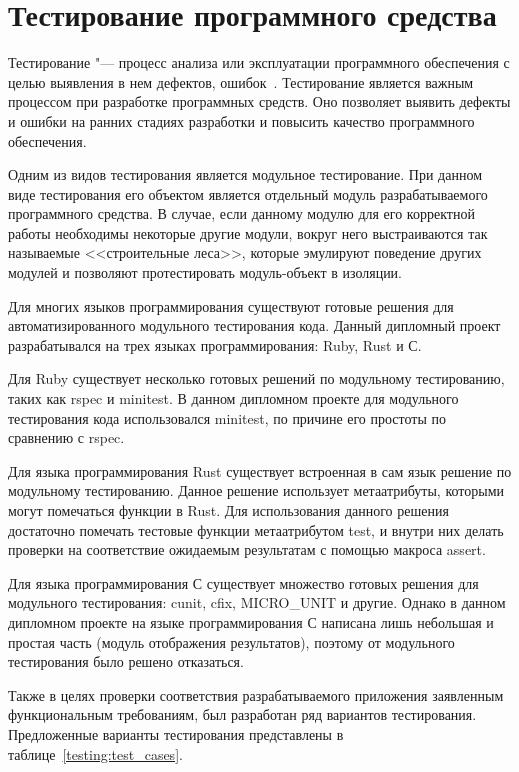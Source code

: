 \section{Тестирование программного средства}
\label{testing}

Тестирование "--- процесс анализа или эксплуатации программного обеспечения с целью выявления в нем дефектов, ошибок~\cite{testing_bahtizin}.
Тестирование является важным процессом при разработке программных средств.
Оно позволяет выявить дефекты и ошибки на ранних стадиях разработки и повысить качество программного обеспечения.

Одним из видов тестирования является модульное тестирование.
При данном виде тестирования его объектом является отдельный модуль разрабатываемого программного средства.
В случае, если данному модулю для его корректной работы необходимы некоторые другие модули, вокруг него выстраиваются так называемые
<<строительные леса>>, которые эмулируют поведение других модулей и позволяют протестировать модуль-объект в изоляции.

Для многих языков программирования существуют готовые решения для автоматизированного модульного тестирования кода.
Данный дипломный проект разрабатывался на трех языках программирования: Ruby, Rust и С.

Для Ruby существует несколько готовых решений по модульному тестированию, таких как rspec и minitest.
В данном дипломном проекте для модульного тестирования кода использовался minitest, по причине его простоты по сравнению с rspec.

Для языка программирования Rust существует встроенная в сам язык решение по модульному тестированию.
Данное решение использует метаатрибуты, которыми могут помечаться функции в Rust.
Для использования данного решения достаточно помечать тестовые функции метаатрибутом test, и внутри них делать проверки на соответствие ожидаемым результатам с помощью макроса assert.

Для языка программирования С существует множество готовых решения для модульного тестирования: cunit, cfix, MICRO\_UNIT и другие.
Однако в данном дипломном проекте на языке программирования С написана лишь небольшая и простая часть (модуль отображения результатов),
поэтому от модульного тестирования было решено отказаться.

Также в целях проверки соответствия разрабатываемого приложения заявленным функциональным требованиям, был разработан ряд вариантов тестирования.
Предложенные варианты тестирования представлены в таблице~\ref{testing:test_cases}.

